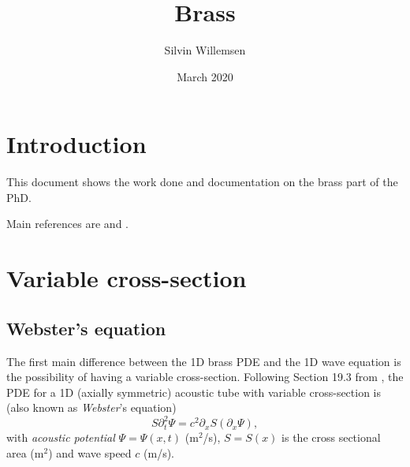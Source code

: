 \documentclass{article}
\title{Brass}
\author{Silvin Willemsen}
\date{March 2020}
\begin{document}
\maketitle

\section{Introduction}
This document shows the work done and documentation on the brass part of the PhD.

Main references are \cite{Bilbao2009} and \cite{Bilbao2018}.

\section{Variable cross-section}
\subsection{Webster's equation}
The first main difference between the 1D brass PDE and the 1D wave equation is the possibility of having a variable cross-section. Following Section 19.3 from \cite{Bilbao2018}, the PDE for a 1D (axially symmetric) acoustic tube with variable cross-section is (also known as \textit{Webster}'s equation)
\begin{equation}\label{eq:webstersPDE}
    S\partial_t^2\Psi = c^2\partial_xS(\partial_x\Psi),
\end{equation}
with \textit{acoustic potential} $\Psi = \Psi(x,t)$ (m$^2$/s), $S = S(x)$ is the cross sectional area (m$^2$) and wave speed $c$ (m/s).
\end{document}
